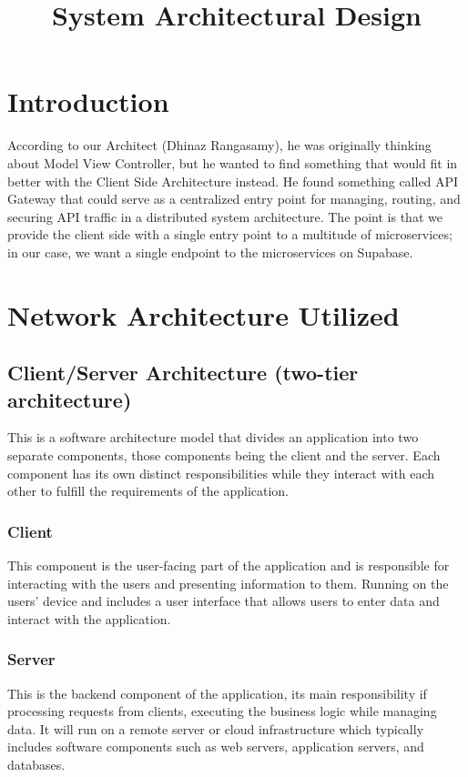 \documentclass{article}
\title{System Architectural Design}
\author{}
\date{}
\begin{document}
\maketitle

\section{Introduction}
According to our Architect (Dhinaz Rangasamy), he was originally thinking about Model View Controller, but he wanted to find something that would fit in better with the Client Side Architecture instead. He found something called API Gateway that could serve as a centralized entry point for managing, routing, and securing API traffic in a distributed system architecture. The point is that we provide the client side with a single entry point to a multitude of microservices; in our case, we want a single endpoint to the microservices on Supabase.

\section{Network Architecture Utilized}
\subsection{Client/Server Architecture (two-tier architecture)}
This is a software architecture model that divides an application into two separate components, those components being the client and the server. Each component has its own distinct responsibilities while they interact with each other to fulfill the requirements of the application.
\subsubsection{Client}
This component is the user-facing part of the application and is responsible for interacting with the users and presenting information to them. Running on the users’ device and includes a user interface that allows users to enter data and interact with the application.
\subsubsection{Server}
This is the backend component of the application, its main responsibility if processing requests from clients, executing the business logic while managing data. It will run on a remote server or cloud infrastructure which typically includes software components such as web servers, application servers, and databases.
\end{document}
